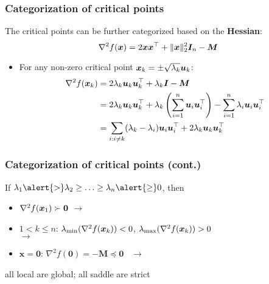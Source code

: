 \documentclass[compress,
mathserif,wide,%
]{beamer}
\begin{document}
\begin{frame}
\frametitle{Categorization of critical points}

The critical points can be further categorized based on the \textbf{Hessian}:
$$ \nabla^2 f({\bm x}) = 2{\bm x}{\bm x}^{\top} + \|\bm{x}\|_2^2 \bm{I}_{n} - {\bm M} $$

\begin{itemize}
\item<1> For any non-zero critical point ${\bm x}_k= \pm \sqrt{\lambda_k } {\bm u}_k$:
\begin{align*}
 \nabla^2 f( {{\bm x}}_k)  & = 2\lambda_k {\bm u}_k {\bm u}_k^{\top} + \lambda_k {\bm I} - {\bm M} \\
 & =  2\lambda_k {\bm u}_k {\bm u}_k^{\top} + \lambda_k \left(\sum_{i=1}^n {\bm u}_i{\bm u}_i^{\top}\right) - \sum_{i=1}^n \lambda_i {\bm u}_i{\bm u}_i^{\top} \\
 & =  \sum_{i:i\neq k} (\lambda_k - \lambda_i ) {\bm u}_i{\bm u}_i^{\top}  + 2\lambda_k {\bm u}_k{\bm u}_k^{\top}
\end{align*}


\end{itemize}



\end{frame}

\begin{frame}
	\frametitle{Categorization of critical points (cont.)}
	If $\lambda_1 \alert{>}\lambda_2\geq \ldots \geq \lambda_n \alert{\geq} 0$, then
\vspace{0.2em}
\begin{itemize}
\itemsep0.4em
\item  $\nabla^2 f( {{\bm x}}_1)\succ \bm{0}$ \qquad\qquad $\rightarrow$ \quad {}
\item $1< k\leq n$: $\lambda_{\min}(\nabla^2 f( {{\bm x}}_k))< 0$, $\lambda_{\max}(\nabla^2 f( {{\bm x}}_k))>0$ \\ \qquad\qquad\qquad\qquad\qquad $\rightarrow$ \quad {}
\item $\bm{x}=\bm{0}$: $\nabla^2 f(\bm{0}) = - \bm{M} \preceq \bm{0}$ ~\quad $\rightarrow$ ~\quad {}   
\end{itemize}

\vfill
{

\begin{varblock}[\textwidth]{}
\centering
all local are global; all saddle are strict
\end{varblock}
}

\end{frame}
\end{document}
